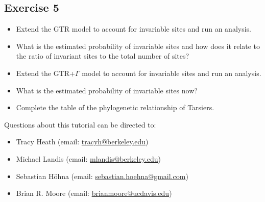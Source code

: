 \subsection{Exercise 5}

\begin{itemize}
\item Extend the GTR model to account for invariable sites and run an analysis.
\item What is the estimated probability of invariable sites and how does it relate to the ratio of invariant sites to the total number of sites?
\item Extend the GTR+$\Gamma$ model to account for invariable sites and run an analysis.
\item What is the estimated probability of invariable sites now?
\item Complete the table of the phylogenetic relationship of Tarsiers.
\end{itemize} 

\vspace{5cm}
Questions about this tutorial can be directed to: \\\vspace{-10mm}
\begin{itemize}
\item Tracy Heath (email: \href{mailto:tracyh@berkeley.edu}{tracyh@berkeley.edu}) \\\vspace{-8mm}
\item Michael Landis (email: \href{mailto:mlandis@berkeley.edu}{mlandis@berkeley.edu}) \\\vspace{-8mm} 
\item Sebastian H\"{o}hna (email: \href{mailto:sebastian.hoehna@gmail.com}{sebastian.hoehna@gmail.com}) \\\vspace{-8mm}
\item Brian R. Moore (email: \href{mailto:brianmoore@ucdavis.edu}{brianmoore@ucdavis.edu}) \\\vspace{-8mm}
\end{itemize}



